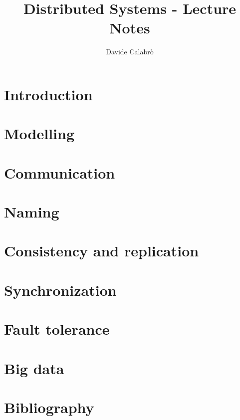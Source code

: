 \documentclass{article}
\title{Distributed Systems - Lecture Notes}
\author{Davide Calabrò}
\begin{document}
    \maketitle
    \newpage
    
    \tableofcontents
    
    \newpage

    \section{Introduction}
    
    
    \newpage

    \section{Modelling}
    
    
    \newpage
    
    \section{Communication}
    
    
    \newpage
    
    \section{Naming}
    
    
    \newpage
    
    \section{Consistency and replication}
    
    
    \newpage
    
    \section{Synchronization}
    
    
    \newpage
    
    \section{Fault tolerance}
    
    
    \newpage
    
    \section{Big data}
    
    
    \newpage
    
    \section{Bibliography}
    
    
    
\end{document}

